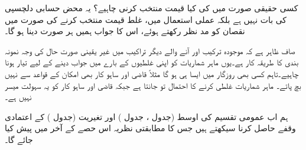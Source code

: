 کسی حقیقی صورت میں  کی کیا قیمت منتخب کرنی چاہیے؟ یہ محض حسابی دلچسپی کی بات نہیں ہے بلکہ عملی استعمال میں، غلط قیمت منتخب کرنے  کی صورت میں نقصان کو مد نظر رکھتے ہوئے، اس کا جواب ہمیں ہر صورت دینا ہو گا۔

صاف ظاہر ہے کہ موجودہ ترکیب اور آنے والے دیگر تراکیب میں غیر یقینی صورت حال کی وجہ نمونہ بندی کا طریقہ کار ہے۔یوں ماہر شماریات کو اپنی غلطیوں کے بارے میں جواب دینے کے لیے تیار ہونا چاہیے۔تاہم کسی بھی روزگار  میں ایسا ہی ہو گا مثلاً قاضی اور ساہو کار بھی امکان کے قواعد سے نہیں بچ پاتے۔ ماہر شماریات غلطی کرنے کا احتمال تو جانتا ہے جبکہ قاضی اور ساہو کار کو 
یہ سہولت میسر نہیں ہے۔

ہم اب عمومی تقسیم کی اوسط  (جدول ، جدول )  اور تغیریت  (جدول ) کے اعتمادی وقفے  حاصل کرنا سیکھتے ہیں جس کا مطابقتی نظریہ اس حصے کے آخر میں پیش کیا جائے گا۔\\
\begin{table}
\caption{معلوم تغیریت $\sigma^2$ والی عمومی تقسیم کی  اوسط $\mu$ کے وقفہ اعتماد کا تعین}
\label{جدول_شماریات_وقفہ_اعتماد_الف}
\centering
{}
\end{table}
\quad {}\\
